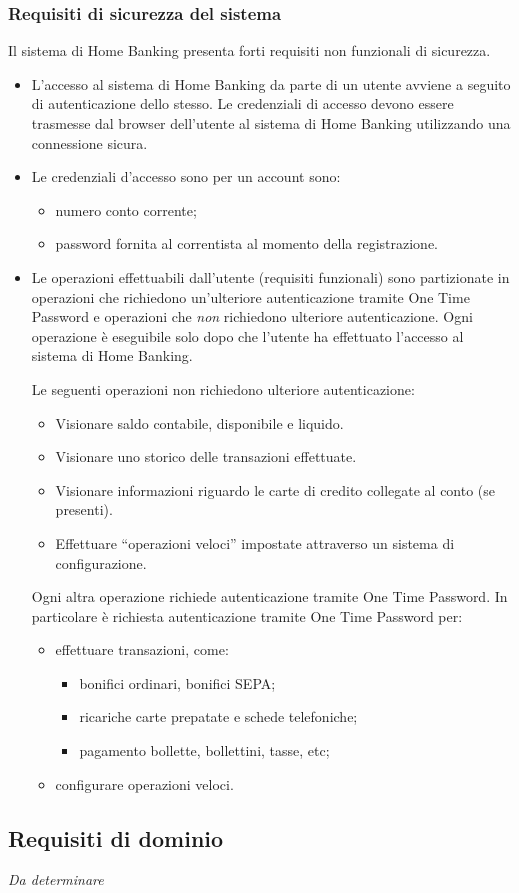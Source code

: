 \subsubsection{Requisiti di sicurezza del sistema}

Il sistema di Home Banking presenta forti requisiti non funzionali di sicurezza.

\begin{itemize}
	\item L'accesso al sistema di Home Banking da parte di un utente avviene a seguito di autenticazione dello stesso.
		Le credenziali di accesso devono essere trasmesse dal browser dell'utente al sistema di Home Banking utilizzando una connessione sicura.
	\item Le credenziali d'accesso sono per un account sono:
		\begin{itemize}
			\item numero conto corrente;
			\item password fornita al correntista al momento della registrazione.
		\end{itemize}
	\item Le operazioni effettuabili dall'utente (requisiti funzionali) sono partizionate in operazioni che richiedono un'ulteriore autenticazione tramite One Time Password e operazioni che \emph{non} richiedono ulteriore autenticazione.
	Ogni operazione \`e eseguibile solo dopo che l'utente ha effettuato l'accesso al sistema di Home Banking.

	Le seguenti operazioni non richiedono ulteriore autenticazione:
	\begin{itemize}
		\item Visionare saldo contabile, disponibile e liquido.
		\item Visionare uno storico delle transazioni effettuate.
		\item Visionare informazioni riguardo le carte di credito collegate al conto (se presenti).
		\item Effettuare ``operazioni veloci'' impostate attraverso un sistema di configurazione.
	\end{itemize}
	
	Ogni altra operazione richiede autenticazione tramite One Time Password.
	In particolare \`e richiesta autenticazione tramite One Time Password per:
	\begin{itemize}
		\item effettuare transazioni, come:
		\begin{itemize}
			\item bonifici ordinari, bonifici SEPA;
			\item ricariche carte prepatate e schede telefoniche;
			\item pagamento bollette, bollettini, tasse, etc;
		\end{itemize}
		\item configurare operazioni veloci.
	\end{itemize}
\end{itemize}

\subsection{Requisiti di dominio}

\emph{Da determinare}
